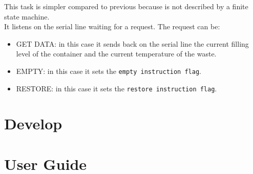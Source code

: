 \documentclass[a4paper,12pt]{report}
\begin{document}
            This task is simpler compared to previous because is not described by a finite state machine.\\
            It listens on the serial line waiting for a request. The request can be:
            \begin{itemize}
                \item GET DATA: in this case it sends back on the serial line the current filling level of the container and the current temperature of the waste.
                \item EMPTY: in this case it sets the \texttt{empty instruction flag}.
                \item RESTORE: in this case it sets the \texttt{restore instruction flag}.
            \end{itemize}

\chapter{Develop}

\appendix
\chapter{User Guide}
\end{document}
